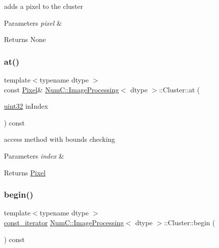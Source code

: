 adds a pixel to the cluster


\begin{DoxyParams}{Parameters}
{\em pixel} & \\
\hline
\end{DoxyParams}
\begin{DoxyReturn}{Returns}
None 
\end{DoxyReturn}
\mbox{\label{class_num_c_1_1_image_processing_1_1_cluster_afe0f04cc5bb5d8554beffe6c78f2ad42}} 
\subsubsection{\texorpdfstring{at()}{at()}}
{\footnotesize\ttfamily template$<$typename dtype $>$ \\
const \mbox{\hyperlink{class_num_c_1_1_image_processing_1_1_pixel}{Pixel}}\& \mbox{\hyperlink{class_num_c_1_1_image_processing}{Num\+C\+::\+Image\+Processing}}$<$ dtype $>$\+::Cluster\+::at (\begin{DoxyParamCaption}\item[{\mbox{\hyperlink{namespace_num_c_ae685802ca6d3035f2b400b081e3953fa}{uint32}}}]{in\+Index }\end{DoxyParamCaption}) const\hspace{0.3cm}{\ttfamily [inline]}}

access method with bounds checking


\begin{DoxyParams}{Parameters}
{\em index} & \\
\hline
\end{DoxyParams}
\begin{DoxyReturn}{Returns}
\mbox{\hyperlink{class_num_c_1_1_image_processing_1_1_pixel}{Pixel}} 
\end{DoxyReturn}
\mbox{\label{class_num_c_1_1_image_processing_1_1_cluster_a692e76f15ac0f1678e0a89654ff42665}} 
\subsubsection{\texorpdfstring{begin()}{begin()}}
{\footnotesize\ttfamily template$<$typename dtype $>$ \\
\mbox{\hyperlink{class_num_c_1_1_image_processing_1_1_cluster_a15d2f9ebeba9062779e57a6fdce9faa0}{const\+\_\+iterator}} \mbox{\hyperlink{class_num_c_1_1_image_processing}{Num\+C\+::\+Image\+Processing}}$<$ dtype $>$\+::Cluster\+::begin (\begin{DoxyParamCaption}{ }\end{DoxyParamCaption}) const\hspace{0.3cm}{\ttfamily [inline]}}

